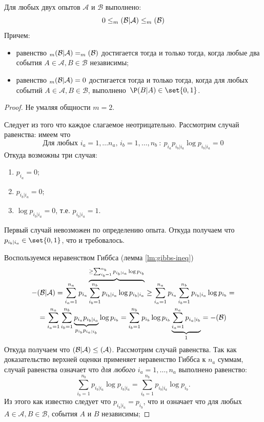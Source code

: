 \begin{proposition}
	\label{prop:conditional-entropy-estimates}
	Для любых двух опытов $\mathcal{A}$ и $\mathcal{B}$ выполнено:
    \[
        0 \leq \relax_m(\mathcal{B}  | \mathcal{A}) \leq \relax_m(\mathcal{B})
    \]
	Причем:
	\begin{itemize}[compact]
		\item равенство \(\relax_m(\mathcal{B}  | \mathcal{A}) = \relax_m(\mathcal{B})\) достигается тогда и только тогда, когда любые два события $A \in \mathcal{A}, B \in \mathcal{B}$ независимы;
		\item равенство \(\relax_m(\mathcal{B}  | \mathcal{A}) = 0\) достигается тогда и только тогда, когда для любых событий $A \in \mathcal{A}, B \in \mathcal{B}$, выполнено~$\P(B | A) \in \set{0, 1}$.
	\end{itemize}
\end{proposition}
\begin{proof}
	 Не умаляя общности $m = 2$.

    \noindent{} Следует из того что каждое слагаемое неотрицательно. Рассмотрим случай равенства: имеем что
	\[
		\text{Для любых $i_a = 1, \ldots n_a$, $i_b = 1, \ldots, n_b$}\ : \ p_{i_a} p_{i_b|i_a} \log p_{i_b|i_a} = 0
	\]
	Откуда возможны три случая:
	\begin{enumerate}[compact]
		\item $p_{i_a} = 0$;
		\item $p_{i_b | i_a} = 0$;
		\item $\log p_{i_b | i_a} = 0$, т.е. $p_{i_b | i_a} = 1$.
	\end{enumerate}
	Первый случай невозможен по определению опыта. Откуда получаем что $p_{i_b | i_a} \in \set{0, 1}$, что и требовалось. 

	\noindent{} Воспользуемся неравенством Гиббса (лемма \ref{lm:gibbs-ineq})
	\begin{multline*}
        - \relax(\mathcal{B}  | \mathcal{A}) 
		= \sum_{i_a = 1}^{n_a} p_{i_a} \overbrace{\sum_{i_b = 1}^{n_b} p_{i_b | i_a} \log p_{i_b | i_a}}^{\geq \sum_{i_b = 1}^{n_b} p_{i_b | i_a} \log p_{i_b}}
		\geq \sum_{i_a = 1}^{n_a} p_{i_a} \sum_{i_b = 1}^{n_b} p_{i_b | i_a} \log p_{i_b} =\\
		= \sum_{i_a = 1}^{n_a} \sum_{i_b = 1}^{n_b}  \underbrace{p_{i_a} p_{i_b | i_a}}_{p_{i_b} p_{i_a | i_b}} \log p_{i_b}  
		= \sum_{i_b = 1}^{n_b} p_{i_b} \log p_{i_b} \underbrace{\sum_{i_a = 1}^{n_a} p_{i_a | i_b}}_{1}
		= -\relax(\mathcal{B})
	\end{multline*}
	Откуда получаем что $\relax(\mathcal{B} | \mathcal{A}) \leq \relax(\mathcal{A})$. Рассмотрим случай равенства. Так как доказательство верхней оценки применяет неравенство Гиббса к $n_a$ суммам, случай равенства означает что \textit{для любого} $i_a = 1, \ldots, n_a$ выполнено равенство:
	\[
			\sum_{i_b = 1}^{n_b} p_{i_b | i_a} \log p_{i_b | i_a} = \sum_{i_b = 1}^{n_b} p_{i_b | i_a} \log p_{i_b}.
	\]
	Из этого как известно следует что $p_{i_b | i_a} = p_{i_b}$, что и означает что для любых $A \in \mathcal{A}, B \in \mathcal{B}$, события $A$ и $B$ независимы;
\end{proof}

